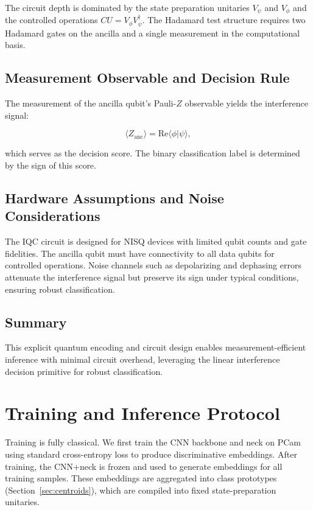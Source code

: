 \documentclass[conference]{IEEEtran}
\begin{document}
The circuit depth is dominated by the state preparation unitaries $V_\psi$ and $V_\phi$ and the controlled operations $CU = V_\phi V_\psi^\dagger$. The Hadamard test structure requires two Hadamard gates on the ancilla and a single measurement in the computational basis.

\subsection{Measurement Observable and Decision Rule}

The measurement of the ancilla qubit's Pauli-$Z$ observable yields the interference signal:

\begin{equation}
\langle Z_{\text{anc}} \rangle = \mathrm{Re}\langle \phi | \psi \rangle,
\end{equation}

which serves as the decision score. The binary classification label is determined by the sign of this score.

\subsection{Hardware Assumptions and Noise Considerations}

The IQC circuit is designed for NISQ devices with limited qubit counts and gate fidelities. The ancilla qubit must have connectivity to all data qubits for controlled operations. Noise channels such as depolarizing and dephasing errors attenuate the interference signal but preserve its sign under typical conditions, ensuring robust classification.

\subsection{Summary}

This explicit quantum encoding and circuit design enables measurement-efficient inference with minimal circuit overhead, leveraging the linear interference decision primitive for robust classification.


\section{Training and Inference Protocol}

Training is fully classical. We first train the CNN backbone and neck on PCam using standard cross-entropy loss to produce discriminative embeddings. After training, the CNN+neck is frozen and used to generate embeddings for all training samples. These embeddings are aggregated into class prototypes (Section~\ref{sec:centroids}), which are compiled into fixed state-preparation unitaries.
\end{document}
